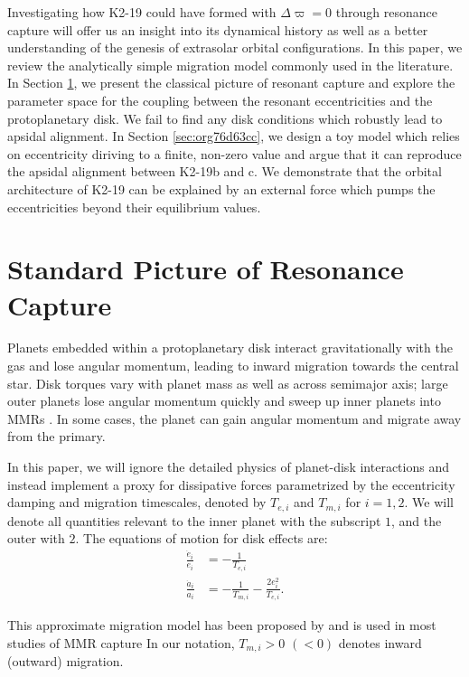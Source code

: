 \documentclass[usenatbib]{mnras}
\begin{document}
Investigating how K2-19 could have formed with \(\Delta\varpi=0\)
through resonance capture will offer us an insight into its dynamical
history as well as a better understanding of the genesis of extrasolar
orbital configurations.  In this paper, we review the analytically
simple migration model commonly used in the literature.  In Section
\ref{sec:orgfcf1233}, we present the classical picture of resonant capture
and explore the parameter space for the coupling between the resonant
eccentricities and the protoplanetary disk. We fail to find any disk
conditions which robustly lead to apsidal alignment.  In Section
\ref{sec:org76d63cc}, we design a toy model which relies on eccentricity
diriving to a finite, non-zero value and argue that it can reproduce
the apsidal alignment between K2-19b and c. We demonstrate that the
orbital architecture of K2-19 can be explained by an external force
which pumps the eccentricities beyond their equilibrium values.

\section{Standard Picture of Resonance Capture}
\label{sec:orgfcf1233}
Planets embedded within a protoplanetary disk interact gravitationally
with the gas and lose angular momentum, leading to inward migration
towards the central star.  Disk torques vary with planet mass as well
as across semimajor axis; large outer planets lose angular momentum
quickly and sweep up inner planets into MMRs
\cite{tanaka_three-dimensional_2004,xu_migration_2018}.  In some
cases, the planet can gain angular momentum and migrate away from the
primary.

In this paper, we will ignore the detailed physics of planet-disk
interactions and instead implement a proxy for dissipative forces
parametrized by the eccentricity damping and migration timescales,
denoted by \(T_{e,i}\) and \(T_{m,i}\) for \(i=1,2\).  We will denote all
quantities relevant to the inner planet with the subscript \(1\), and the
outer with \(2\).  The equations of motion for disk effects are:
\begin{align}\label{eq:disforce}
  \frac{\dot{e}_i}{e_i} &= -\frac{1}{T_{e,i}} \\
  \frac{\dot{a}_i}{a_i} &= -\frac{1}{T_{m,i}} -\frac{2e_i^2}{T_{e,i}}.
\end{align}

\noindent This approximate migration model has been proposed
by \citet{goldreich_disk-satellite_1980-1} and is used in most studies
of MMR capture
\cite[e.g.][]{goldreich_overstable_2014,xu_migration_2018} In our
notation, \(T_{m,i}>0\) \((<0)\) denotes inward (outward) migration.
\end{document}
